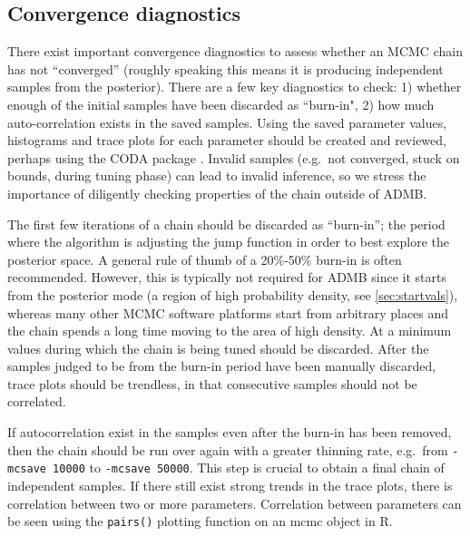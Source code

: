 \documentclass{article}\usepackage[]{graphicx}\usepackage[]{color}
\begin{document}
\subsection{Convergence diagnostics} \label{sec:diag}

There exist important convergence diagnostics to assess whether an MCMC
chain has not ``converged'' (roughly speaking this means it is producing
independent samples from the posterior). There are a few key diagnostics to
check: 1) whether enough of the initial samples have been discarded as
``burn-in", 2) how much auto-correlation exists in the saved samples. Using
the saved parameter values, histograms and trace plots for each parameter
should be created and reviewed, perhaps using the CODA package
\cite{plummer2006}. Invalid samples (e.g.\ not converged, stuck on bounds,
during tuning phase) can lead to invalid inference, so we stress the
importance of diligently checking properties of the chain outside of ADMB.


The first few iterations of a chain should be discarded as ``burn-in''; the
period where the algorithm is adjusting the jump function in order to best
explore the posterior space. A general rule of thumb of a
20\%-50\% burn-in is often recommended. However, this is typically not
required for ADMB since it starts from the posterior mode (a region of high
probability density, see \ref{sec:startvals}), whereas many other MCMC
software platforms start from arbitrary places and the chain spends a long
time moving to the area of high density. At a minimum values during which
the chain is being tuned should be discarded.  After the samples judged to
be from the burn-in period have been manually discarded, trace plots should
be trendless, in that consecutive samples should not be correlated.

If autocorrelation exist in the samples even after the burn-in has been
removed, then the chain should be run over again with a greater thinning
rate, e.g.\ from \texttt{-mcsave 10000} to \texttt{-mcsave 50000}.  This
step is crucial to obtain a final chain of independent samples. If there
still exist strong trends in the trace plots, there is correlation between
two or more parameters. Correlation between parameters can be seen using
the \texttt{pairs()} plotting function on an mcmc object in R.
\end{document}
